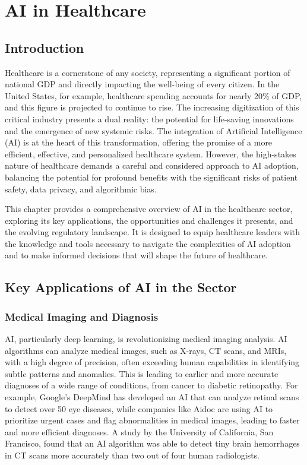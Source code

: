 \chapter{AI in Healthcare}
\label{cha:ai_in_healthcare}

\section{Introduction}

Healthcare is a cornerstone of any society, representing a significant portion of national GDP and directly impacting the well-being of every citizen. In the United States, for example, healthcare spending accounts for nearly 20\% of GDP, and this figure is projected to continue to rise. The increasing digitization of this critical industry presents a dual reality: the potential for life-saving innovations and the emergence of new systemic risks. The integration of Artificial Intelligence (AI) is at the heart of this transformation, offering the promise of a more efficient, effective, and personalized healthcare system. However, the high-stakes nature of healthcare demands a careful and considered approach to AI adoption, balancing the potential for profound benefits with the significant risks of patient safety, data privacy, and algorithmic bias.

This chapter provides a comprehensive overview of AI in the healthcare sector, exploring its key applications, the opportunities and challenges it presents, and the evolving regulatory landscape. It is designed to equip healthcare leaders with the knowledge and tools necessary to navigate the complexities of AI adoption and to make informed decisions that will shape the future of healthcare.

\section{Key Applications of AI in the Sector}

\subsection{Medical Imaging and Diagnosis}

AI, particularly deep learning, is revolutionizing medical imaging analysis. AI algorithms can analyze medical images, such as X-rays, CT scans, and MRIs, with a high degree of precision, often exceeding human capabilities in identifying subtle patterns and anomalies. This is leading to earlier and more accurate diagnoses of a wide range of conditions, from cancer to diabetic retinopathy. For example, Google's DeepMind has developed an AI that can analyze retinal scans to detect over 50 eye diseases, while companies like Aidoc are using AI to prioritize urgent cases and flag abnormalities in medical images, leading to faster and more efficient diagnoses. A study by the University of California, San Francisco, found that an AI algorithm was able to detect tiny brain hemorrhages in CT scans more accurately than two out of four human radiologists.


